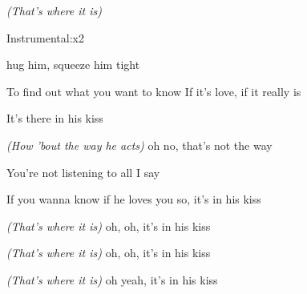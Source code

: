 \emph{(That's where it is)}

Instrumental:\hrulefill{}\hrulefill{}\hrulefill{}\hrulefill{}\hrulefill x2

hug him, squeeze him tight

To find out what you want to know If it's love, if it really is

It's there in his kiss

\emph{(How 'bout the way he acts)} oh no, that's not the way

You're not listening to all I say

If you wanna know if he loves you so, it's in his kiss
 
\emph{(That's where it is)} oh, oh, it's in his kiss

\emph{(That's where it is)} oh, oh, it's in his kiss

\emph{(That's where it is)} oh yeah, it's in his kiss

\hrulefill{}\hrulefill{}
